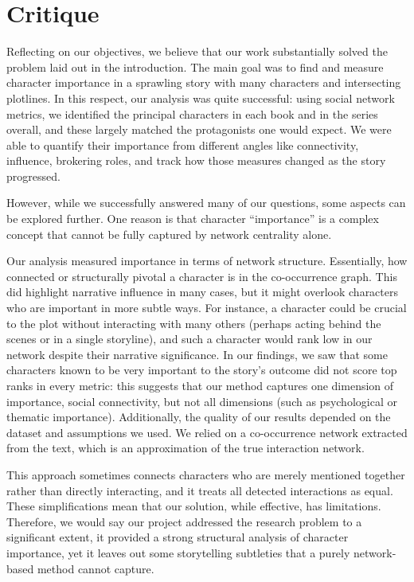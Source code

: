\documentclass[12pt, a4paper]{article}
\begin{document}
\section{Critique}
Reflecting on our objectives, we believe that our work substantially solved the problem laid out in the introduction. 
The main goal was to find and measure character importance in a sprawling story with many characters and intersecting plotlines. 
In this respect, our analysis was quite successful: using social network metrics, 
we identified the principal characters in each book and in the series overall, 
and these largely matched the protagonists one would expect. We were able to quantify their importance from different angles
like connectivity, influence, brokering roles, and track how those measures changed as the story progressed. 



However, while we successfully answered many of our questions, some aspects can be explored further.
One reason is that character “importance” is a complex concept that cannot be fully captured by network centrality alone. 

Our analysis measured importance in terms of network structure. Essentially, how connected or structurally pivotal a character 
is in the co-occurrence graph. This did highlight narrative influence in many cases, but it might overlook characters who are important in more subtle ways. 
For instance, a character could be crucial to the plot without interacting with many others (perhaps acting behind the scenes or in a single storyline), 
and such a character would rank low in our network despite their narrative significance. In our findings, we saw that some characters known to be very 
important to the story’s outcome did not score top ranks in every metric: this suggests that our method captures one dimension of importance,
social connectivity, but not all dimensions (such as psychological or thematic importance). Additionally, the quality of our results depended 
on the dataset and assumptions we used. We relied on a co-occurrence network extracted from the text, which is an approximation of the true interaction network.
 
This approach sometimes connects characters who are merely mentioned together rather than directly interacting, and it treats all detected interactions as
  equal. These simplifications mean that our solution, while effective, has limitations. Therefore, we would say our project addressed the 
  research problem to a significant extent, it provided a strong structural analysis of character importance, 
  yet it leaves out some storytelling subtleties that a purely network-based method cannot capture.
\end{document}
